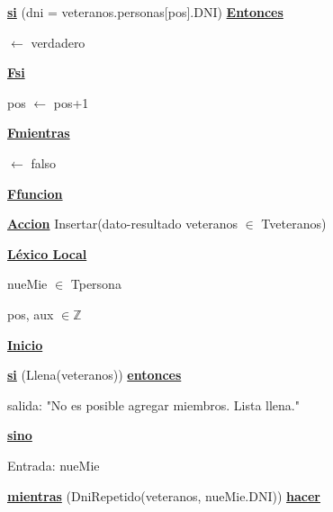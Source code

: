 \documentclass{article}
\begin{document}
                \hspace{16mm}\underline{\textbf{si}} (dni = veteranos.personas[pos].DNI) \underline{\textbf{Entonces}}

                    \hspace{20mm}$\leftarrow$ verdadero

                \hspace{16mm}\underline{\textbf{Fsi}}

                \hspace{16mm}pos $\leftarrow$ pos+1
                
            \hspace{12mm}\underline{\textbf{Fmientras}}

            \hspace{12mm}$\leftarrow$ falso
    
    \hspace{4mm}\underline{\textbf{Ffuncion}}

    \vspace{4mm}

    \hspace{4mm}\underline{\textbf{Accion}} Insertar(dato-resultado veteranos $\in$ Tveteranos)

        \hspace{8mm}\underline{\textbf{Léxico Local}}

            \hspace{12mm}nueMie $\in$ Tpersona

            \hspace{12mm}pos, aux $\in \mathbb{Z}$

        \hspace{8mm}\underline{\textbf{Inicio}}

            \hspace{12mm}\underline{\textbf{si}} (Llena(veteranos)) \underline{\textbf{entonces}}

                \hspace{16mm}salida: "No es posible agregar miembros. Lista llena."

            \hspace{12mm}\underline{\textbf{sino}}

                \hspace{16mm}Entrada: nueMie

                \hspace{16mm}\underline{\textbf{mientras}} (DniRepetido(veteranos, nueMie.DNI)) \underline{\textbf{hacer}}
\end{document}
